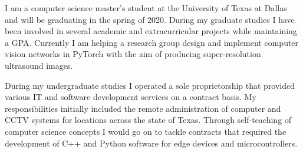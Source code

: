 \begin{cvletter}

	I am a computer science master's student at the University
	of Texas at Dallas and will be graduating in the spring of 2020. 
  During my graduate studies I have been involved in several academic and
  extracurricular projects while maintaining a \gpa{} GPA. Currently I am
  helping a research group design and implement computer vision networks 
  in PyTorch with the aim of producing super-resolution ultrasound images.

  During my undergraduate studies I operated a sole proprietorship
	that provided various IT and software development services on a
	contract basis. My responsibilities initially included
	the remote administration of computer and CCTV systems for locations
	across the state of Texas. 
	Through self-teaching of computer science concepts I would go on
	to tackle contracts that required the development of C++ and Python 
  software for edge devices and microcontrollers.

\end{cvletter}
